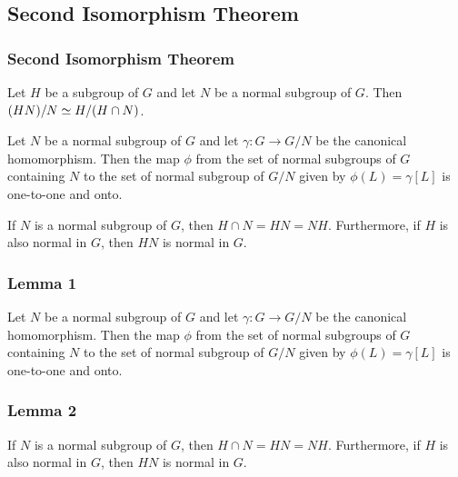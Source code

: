 \subsection{Second Isomorphism Theorem}
\begin{frame}
\frametitle{Second Isomorphism Theorem}
\begin{theorem}
	Let $H$ be a subgroup of $G$ and let $N$ be a normal subgroup of $G$.
	Then $(HN)/N \simeq H/(H\cap N)$.
\end{theorem}
\begin{lemma}
	Let $N$ be a normal subgroup of $G$ and let $\gamma : G \to G/N$ be the canonical homomorphism.
	Then the map $\phi$ from the set of normal subgroups of $G$ containing $N$ to the set of normal subgroup of $G/N$ given by $\phi(L) = \gamma[L]$ is one-to-one and onto.
\end{lemma}
\begin{lemma}
	If $N$ is a normal subgroup of $G$, then $H \cap N = HN = NH$.
	Furthermore, if $H$ is also normal in $G$, then $HN$ is normal in $G$.
\end{lemma}
\end{frame}
\begin{frame}
	\frametitle{Lemma 1}
\begin{lemma}
	Let $N$ be a normal subgroup of $G$ and let $\gamma : G \to G/N$ be the canonical homomorphism.
	Then the map $\phi$ from the set of normal subgroups of $G$ containing $N$ to the set of normal subgroup of $G/N$ given by $\phi(L) = \gamma[L]$ is one-to-one and onto.
\end{lemma}
\end{frame}
\begin{frame}
	\frametitle{Lemma 2}
\begin{lemma}
	If $N$ is a normal subgroup of $G$, then $H \cap N = HN = NH$.
	Furthermore, if $H$ is also normal in $G$, then $HN$ is normal in $G$.
\end{lemma}
\end{frame}
